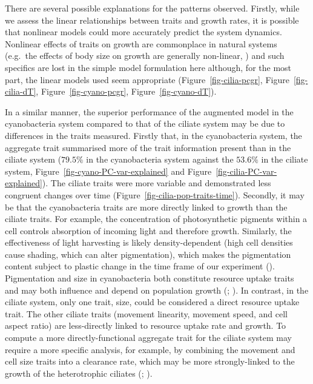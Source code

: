 \documentclass[
  letterpaper,
  DIV=11,
  numbers=noendperiod]{scrartcl}
\begin{document}
There are several possible explanations for the patterns observed.
Firstly, while we assess the linear relationships between traits and
growth rates, it is possible that nonlinear models could more accurately
predict the system dynamics. Nonlinear effects of traits on growth are
commonplace in natural systems (e.g.~the effects of body size on growth
are generally non-linear,
) and such specifics are lost in the simple model formulation here
although, for the most part, the linear models used seem appropriate
(Figure~\ref{fig-cilia-pcgr}, Figure~\ref{fig-cilia-dT},
Figure~\ref{fig-cyano-pcgr}, Figure~\ref{fig-cyano-dT}).

In a similar manner, the superior performance of the augmented model in
the cyanobacteria system compared to that of the ciliate system may be
due to differences in the traits measured. Firstly that, in the
cyanobacteria system, the aggregate trait summarised more of the trait
information present than in the ciliate system (\(79.5\%\) in the
cyanobacteria system against the \(53.6\%\) in the ciliate system,
Figure~\ref{fig-cyano-PC-var-explained} and
Figure~\ref{fig-cilia-PC-var-explained}). The ciliate traits were more
variable and demonstrated less congruent changes over time
(Figure~\ref{fig-cilia-pop-traits-time}). Secondly, it may be that the
cyanobacteria traits are more directly linked to growth than the ciliate
traits. For example, the concentration of photosynthetic pigments within
a cell controls absorption of incoming light and therefore growth.
Similarly, the effectiveness of light harvesting is likely
density-dependent (high cell densities cause shading, which can alter
pigmentation), which makes the pigmentation content subject to plastic
change in the time frame of our experiment
(). Pigmentation and size in
cyanobacteria both constitute resource uptake traits and may both
influence and depend on population growth
(;
). In contrast, in the
ciliate system, only one trait, size, could be considered a direct
resource uptake trait. The other ciliate traits (movement linearity,
movement speed, and cell aspect ratio) are less-directly linked to
resource uptake rate and growth. To compute a more directly-functional
aggregate trait for the ciliate system may require a more specific
analysis, for example, by combining the movement and cell size traits
into a clearance rate, which may be more strongly-linked to the growth
of the heterotrophic ciliates (; ).
\end{document}
